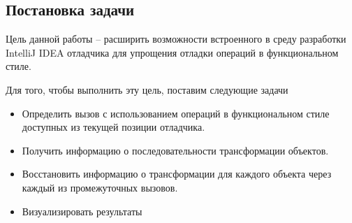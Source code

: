 \subsection{Постановка задачи}
Цель данной работы -- расширить возможности встроенного в среду разработки IntelliJ IDEA отладчика для упрощения отладки операций в функциональном стиле.

Для того, чтобы выполнить эту цель, поставим следующие задачи
\begin{itemize}
	\item Определить вызов с использованием операций в функциональном стиле доступных из текущей позиции отладчика.
	\item Получить информацию о последовательности трансформации объектов.
	\item Восстановить информацию о трансформации для каждого объекта через каждый из промежуточных вызовов.
	\item Визуализировать результаты
\end{itemize}
